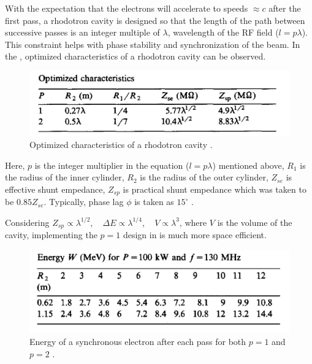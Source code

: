 \documentclass[a4paper,oneside,12pt]{report}
\numberwithin{equation}{chapter}
\begin{document}
\vspace{-18pt}
With the expectation that the electrons will accelerate to speeds $\approx c$ after the first pass, a rhodotron cavity is designed so that the length of the path between successive passes is an integer multiple of $\lambda$, wavelength of the RF field ($l=p\lambda \label{eq:lpl}$).
This constraint helps with  phase stability and synchronization of the beam.
In the , optimized characteristics of a rhodotron cavity can be observed. 
\vspace{15pt}
\begin{figure}[H]
    \centering
    \includegraphics[width=.8\textwidth]{./figures/pottier_table1_cropped.png}
    \vspace{-8pt}
    \caption{Optimized characteristics of a rhodotron cavity \cite{rhodo_pottier}.}
    \label{fig:pottier_table1}
\end{figure}

\vspace{-15pt}
Here, $p$ is the integer multiplier in the equation ($l=p\lambda$) mentioned above, $R_1$ is the radius of the inner cylinder, $R_2$ is the radius of the outer cylinder, 
$Z_{se}$ is effective shunt empedance, $Z_{sp}$ is practical shunt empedance which was taken to be $0.85 Z_{se}$. Typically, phase lag $\phi$ is taken as $15^\circ$ \cite{rhodo_pottier}. 

Considering $Z_{sp} \propto \lambda^{1/2}$, \,\,\, $\Delta E \propto \lambda^{1/4}$, \,\,\,   $V \propto \lambda^3$, where $V$ is the volume of the cavity, implementing the $p=1$ design in  is much more space efficient.
\vspace{15pt}
\begin{figure}[H]
    \centering
    \includegraphics[width=.8\textwidth]{./figures/pottier_table2_cropped.png}
    \vspace{-13pt}
    \caption{Energy of a synchronous electron after each pass for both $p=1$ and $p=2$ \cite{rhodo_pottier}.}
    \label{fig:pottier_table2}
\end{figure}
\end{document}
